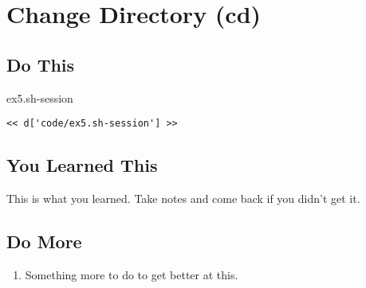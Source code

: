 \chapter{Change Directory (cd)}

\section{Do This}

\begin{code}{ex5.sh-session}
\begin{Verbatim}
<< d['code/ex5.sh-session'] >>
\end{Verbatim}
\end{code}


\section{You Learned This}

This is what you learned.  Take notes and come back if you didn't get it.

\section{Do More}

\begin{enumerate}
\item Something more to do to get better at this.
\end{enumerate}

